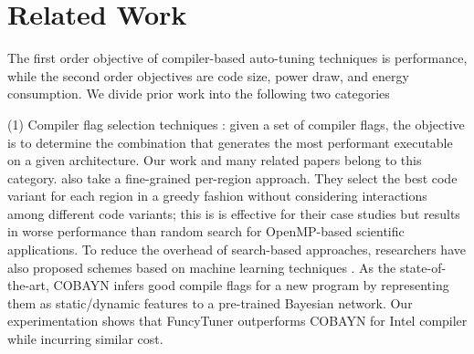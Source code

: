 \section{Related Work} \label{related work}


 The first order objective of compiler-based auto-tuning techniques \cite{Hall:2009:CRN:1461928.1461946,grandstrand:2004} is performance, while the second order objectives are code size, power draw, and energy consumption.
 We divide prior work into the following two categories

\vspace{.25em}
\noindent (1) Compiler flag selection techniques \cite{1611551,PanE06,iterativecompilation,Cavazos:2007:RSG:1251974.1252540, Pan:2008:taco, cere, cern2012,Chen:2010:EIO:1806596.1806647, Vaswani:2007:MSE:1251974.1252536, Kulkarni:2004:FSE:996841.996863, 4625477}:
given a set of compiler flags, the objective is to determine the combination that generates the most performant executable on a given architecture.
Our work and many related papers \cite{Chen:2010:EIO:1806596.1806647, cere,PanE06,Pan:2008:taco} belong to this category.
\cite{Pan:2008:taco, cere} also take a fine-grained per-region approach.
They select the best code variant for each region in a greedy fashion without
considering interactions among different code variants; this is is effective for
their case studies but results in  worse performance than random search
for OpenMP-based scientific applications.
To reduce the overhead of search-based approaches, researchers have also proposed
schemes based on machine learning techniques \cite {1611549, Cavazos:2007:RSG:1251974.1252540, cobayn}.
As the state-of-the-art, COBAYN \cite{cobayn} infers good compile flags for a new program by representing them as static/dynamic features to a pre-trained Bayesian network.
Our experimentation shows that FuncyTuner outperforms COBAYN for Intel compiler
while incurring similar cost.


